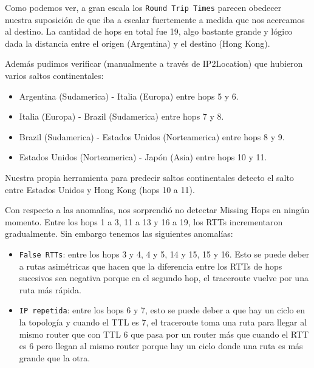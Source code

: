 \begin{figure}[H]
    \centering
\end{figure}

Como podemos ver, a gran escala los \texttt{Round Trip Times} parecen obedecer nuestra suposición de que iba a escalar fuertemente a medida que nos acercamos al destino. La cantidad de hops en total fue 19, algo bastante grande y lógico dada la distancia entre el origen (Argentina) y el destino (Hong Kong).

Además pudimos verificar (manualmente a través de IP2Location) que hubieron varios saltos continentales:
\begin{itemize}
\item Argentina (Sudamerica) - Italia (Europa) entre hops 5 y 6.
\item Italia (Europa) - Brazil (Sudamerica) entre hops 7 y 8.
\item Brazil (Sudamerica) - Estados Unidos (Norteamerica) entre hops 8 y 9.
\item Estados Unidos (Norteamerica) - Japón (Asia) entre hops 10 y 11.
\end{itemize}
Nuestra propia herramienta para predecir saltos continentales detecto el salto entre Estados Unidos y Hong Kong (hops 10 a 11).

Con respecto a las anomalías, nos sorprendió no detectar Missing Hops en ningún momento. Entre los hops 1 a 3, 11 a 13 y 16 a 19, los RTTs incrementaron gradualmente. Sin embargo tenemos las siguientes anomalías:

\begin{itemize}
\item \texttt{False RTTs}: entre los hops 3 y 4, 4 y 5, 14 y 15, 15 y 16. Esto se puede deber a rutas asimétricas que hacen que la diferencia entre los RTTs de hops sucesivos sea negativa porque en el segundo hop, el traceroute vuelve por una ruta más rápida.
\item \texttt{IP repetida}: entre los hops 6 y 7, esto se puede deber a que hay un ciclo en la topología y cuando el TTL es 7, el traceroute toma una ruta para llegar al mismo router que con TTL 6 que pasa por un router más que cuando el RTT es 6 pero llegan al mismo router porque hay un ciclo donde una ruta es más grande que la otra.
\end{itemize}
